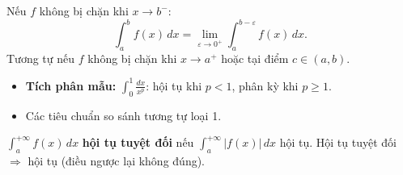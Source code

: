 \documentclass[12pt,a4paper]{article}
\begin{document}
\begin{dinhnghia}[title={Tích phân suy rộng loại 2 (hàm không bị chặn)}]
  Nếu $f$ không bị chặn khi $x \to b^-$:
  \[
    \int_a^b f(x)\,dx = \lim_{\varepsilon \to 0^+} \int_a^{b-\varepsilon} f(x)\,dx.
  \]
  Tương tự nếu $f$ không bị chặn khi $x \to a^+$ hoặc tại điểm $c \in (a,b)$.
\end{dinhnghia}

\begin{dinhly}[title={Tiêu chuẩn hội tụ loại 2}]
  \begin{itemize}
    \item \textbf{Tích phân mẫu:} $\displaystyle\int_0^1 \frac{dx}{x^p}$: hội tụ khi $p < 1$, phân kỳ khi $p \ge 1$.
    \item Các tiêu chuẩn so sánh tương tự loại 1.
  \end{itemize}
\end{dinhly}

\begin{dinhnghia}[title={Hội tụ tuyệt đối}]
  $\displaystyle\int_a^{+\infty} f(x)\,dx$ \textbf{hội tụ tuyệt đối} nếu $\displaystyle\int_a^{+\infty} |f(x)|\,dx$ hội tụ. Hội tụ tuyệt đối $\Rightarrow$ hội tụ (điều ngược lại không đúng).
\end{dinhnghia}
\end{document}
